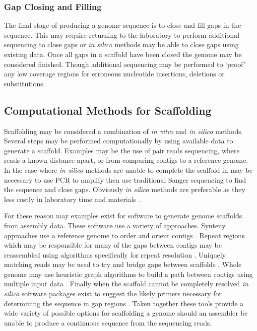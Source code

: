 \documentclass[10pt]{bmc_article}
\newenvironment{bmcformat}{\begin{raggedright}\baselineskip20pt\sloppy\setboolean{publ}{false}}{\end{raggedright}\baselineskip20pt\sloppy}
\begin{document}
\begin{bmcformat}
\subsubsection*{Gap Closing and Filling} %

The final stage of producing a genome sequence is to close and fill gaps in
the sequence. This may require returning to the laboratory to perform
additional sequencing to close gaps or \emph{in silico} methods may be able to
close gaps using existing data. Once all gaps in a scaffold have been closed
the genome may be considered finished. Though additional sequencing may be
performed to `proof' any low coverage regions for erroneous nucleotide
insertions, deletions or substitutions.

\subsection*{Computational Methods for Scaffolding} %

Scaffolding may be considered a combination of \emph{in vitro} and \emph{in
silico} methods. Several steps may be performed computationally by using
available data to generate a scaffold. Examples may be the use of pair reads
sequencing, where reads a known distance apart, or from comparing contigs to
a reference genome. In the case where \emph{in silico} methods are unable to
complete the scaffold in may be necessary to use PCR to amplify then use
traditional Sanger sequencing to find the sequence and close gaps. Obviously
\emph{in silico} methods are preferable as they less costly in laboratory time
and materials \cite{nagarajan2010}. \pb

For these reason may examples exist for software to generate genome scaffolds
from assembly data. These software use a variety of approaches. Synteny
approaches use a reference genome to order and orient contigs
\cite{richter2007,zhao2008}. Repeat regions which may be responsible for many
of the gaps between contigs may be reassembled using algorithms specifically
for repeat resolution \cite{mulyukov2002,koren2010}. Uniquely matching reads
may be used to try and bridge gaps between scaffolds \cite{tsai2010}. Whole
genome may use heuristic graph algorithms to build a path between contigs using
multiple input data \cite{pop2004,dayarian2010}. Finally when the scaffold
cannot be completely resolved \emph{in silico} software packages exist to
suggest the likely primers necessary for determining the sequence in gap
regions \cite{gordon2001,nagarajan2010}. Taken together these tools provide
a wide variety of possible options for scaffolding a genome should an assembler
be unable to produce a continuous sequence from the sequencing reads. \pb


\end{bmcformat}
\end{document}
